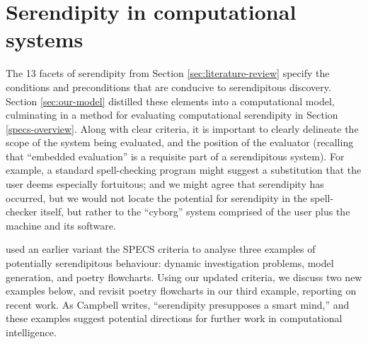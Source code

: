 \section{Serendipity in computational systems} \label{sec:computational-serendipity}

The 13 facets of serendipity from Section \ref{sec:literature-review} specify the
conditions and preconditions that are conducive to serendipitous
discovery.  Section \ref{sec:our-model} distilled these elements into a computational model,
culminating in a method for evaluating computational serendipity in Section \ref{specs-overview}.
%
Along with clear criteria, it is important to clearly delineate the
scope of the system being evaluated, and the position of the evaluator
(recalling that ``embedded evaluation'' is a requisite part of a
serendipitous system).
For example, a standard spell-checking program might suggest a substitution that the user
deems especially fortuitous; and we might agree that serendipity has
occurred, but we would not locate the potential for serendipity in
the spell-checker itself, but rather to the ``cyborg'' system
comprised of the user plus the machine and its software.

 used an earlier variant the SPECS criteria
to analyse three examples of potentially serendipitous behaviour:
dynamic investigation problems, model generation, and poetry
flowcharts.  Using our updated criteria, we discuss two new examples
below, and revisit poetry flowcharts in our third example, reporting
on recent work.  As Campbell \citeyear{campbell2005serendipity}
writes, ``serendipity presupposes a smart mind,'' and these examples
suggest potential directions for further work in computational
intelligence.


